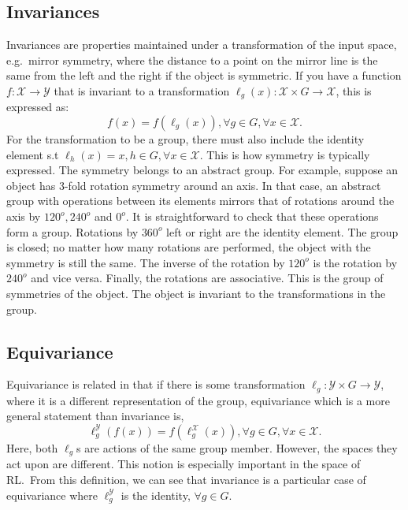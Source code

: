 \subsection{Invariances}
Invariances are properties maintained under a transformation of the input space, e.g.\ mirror symmetry, where the distance to a point on the mirror line is the same from the left and the right if the object is symmetric. If you have a function $f: \mathcal{X} \rightarrow \mathcal{Y}$ that is invariant to a transformation $\ell_g(x): \mathcal{X} \times G \rightarrow \mathcal{X}$, this is expressed as:
\begin{equation}
	f(x) = f(\ell_g(x)),   \forall g \in G, \forall x \in \mathcal{X}.
\end{equation}
For the transformation to be a group, there must also include the identity element s.t $\ell_h(x) = x,  h \in G, \forall x\in \mathcal{X}$. This is how symmetry is typically expressed. The symmetry belongs to an abstract group. For example, suppose an object has 3-fold rotation symmetry around an axis. In that case, an abstract group with operations between its elements mirrors that of rotations around the axis by $120^o, 240^o$ and $0^o$. It is straightforward to check that these operations form a group. Rotations by $360^o$ left or right are the identity element. The group is closed; no matter how many rotations are performed, the object with the symmetry is still the same. The inverse of the rotation by $120^o$ is the rotation by $240^o$ and vice versa. Finally, the rotations are associative. This is the group of symmetries of the object. The object is invariant to the transformations in the group.

\subsection{Equivariance}
Equivariance is related in that if there is some transformation $\ell_g: \mathcal{Y} \times G \rightarrow \mathcal{Y}$, where it is a different representation of the group, equivariance which is a more general statement than invariance is,
\begin{equation}
	\ell_g^\mathcal{Y}( f(x) )= f(\ell_g^\mathcal{X}( x)), \forall g \in G, \forall x \in \mathcal{X}.
\end{equation}
Here, both $\ell_g$s are actions of the same group member. However, the spaces they act upon are different. This notion is especially important in the space of RL.\ From this definition, we can see that invariance is a particular case of equivariance where $\ell^\mathcal{Y}_g$ is the identity, $\forall g \in G$.
